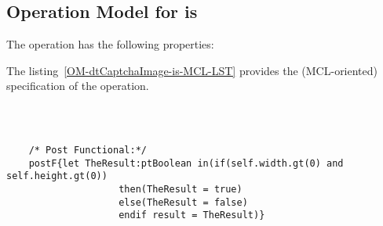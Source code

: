 \subsection{Operation Model for is}

\label{OM-is}


The  operation has the following properties:

	\begin{operationmodel}



		


	\end{operationmodel}



	\vspace{1cm}
	The listing~\ref{OM-dtCaptchaImage-is-MCL-LST} provides the \msrmessir (MCL-oriented) specification of the operation.
	
	\scriptsize
	\vspace{0.5cm}
	\begin{lstlisting}[style=MessirStyle,firstnumber=auto,captionpos=b,caption={\msrmessir (MCL-oriented) specification of the operation \emph{is}.},label=OM-dtCaptchaImage-is-MCL-LST]

	
	
	/* Post Functional:*/ 
	postF{let TheResult:ptBoolean in(if(self.width.gt(0) and self.height.gt(0))
					then(TheResult = true)
					else(TheResult = false)
					endif result = TheResult)}
	
	
	\end{lstlisting}
	\normalsize 
	
	
	
	





